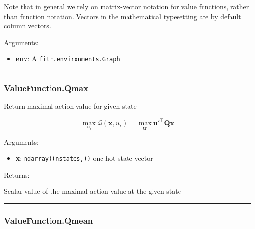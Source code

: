 Note that in general we rely on matrix-vector notation for value
functions, rather than function notation. Vectors in the mathematical
typesetting are by default column vectors.

Arguments:

\begin{itemize}
\tightlist
\item
  \textbf{env}: A \texttt{fitr.environments.Graph}
\end{itemize}

\begin{center}\rule{0.5\linewidth}{\linethickness}\end{center}

\hypertarget{valuefunction.qmax}{%
\subsubsection{ValueFunction.Qmax}\label{valuefunction.qmax}}

\begin{Shaded}
\begin{Highlighting}[]
\end{Highlighting}
\end{Shaded}

Return maximal action value for given state

\[
\max_{u_i}\mathcal Q(\mathbf x, u_i) = \max_{\mathbf u'} \mathbf u'^\top \mathbf Q \mathbf x
\]

Arguments:

\begin{itemize}
\tightlist
\item
  \textbf{x}: \texttt{ndarray((nstates,))} one-hot state vector
\end{itemize}

Returns:

Scalar value of the maximal action value at the given state

\begin{center}\rule{0.5\linewidth}{\linethickness}\end{center}

\hypertarget{valuefunction.qmean}{%
\subsubsection{ValueFunction.Qmean}\label{valuefunction.qmean}}

\begin{Shaded}
\begin{Highlighting}[]
\end{Highlighting}
\end{Shaded}

